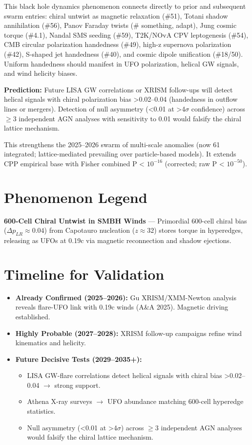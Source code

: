 \documentclass[11pt]{article}
\begin{document}
This black hole dynamics phenomenon connects directly to prior and subsequent swarm entries: chiral untwist as magnetic relaxation (\#51), Totani shadow annihilation (\#56), Panov Faraday twists (\# something, adapt), Jung cosmic torque (\#4.1), Nandal SMS seeding (\#59), T2K/NOvA CPV leptogenesis (\#54), CMB circular polarization handedness (\#49), high-z supernova polarization (\#42), S-shaped jet handedness (\#40), and cosmic dipole unification (\#18/50). Uniform handedness should manifest in UFO polarization, helical GW signals, and wind helicity biases.

\textbf{Prediction:} Future LISA GW correlations or XRISM follow-ups will detect helical signals with chiral polarization bias >0.02--0.04 (handedness in outflow lines or mergers). Detection of null asymmetry (<0.01 at >4$\sigma$ confidence) across $\geq 3$ independent AGN analyses with sensitivity to 0.01 would falsify the chiral lattice mechanism.

This strengthens the 2025--2026 swarm of multi-scale anomalies (now 61 integrated; lattice-mediated prevailing over particle-based models). It extends CPP empirical base with Fisher combined P < $10^{-16}$ (corrected; raw P < $10^{-50}$).

\section{Phenomenon Legend}
\textbf{600-Cell Chiral Untwist in SMBH Winds} — Primordial 600-cell chiral bias ($\Delta p_{LR} \approx 0.04$) from Capotauro nucleation ($z \approx 32$) stores torque in hyperedges, releasing as UFOs at 0.19c via magnetic reconnection and shadow ejections.

\section{Timeline for Validation}
\begin{itemize}
    \item \textbf{Already Confirmed (2025--2026):} Gu XRISM/XMM-Newton analysis reveals flare-UFO link with 0.19c winds (A\&A 2025). Magnetic driving established.
    \item \textbf{Highly Probable (2027--2028):} XRISM follow-up campaigns refine wind kinematics and helicity.
    \item \textbf{Future Decisive Tests (2029--2035+):}
    \begin{itemize}
        \item LISA GW-flare correlations detect helical signals with chiral bias >0.02--0.04 $\to$ strong support.
        \item Athena X-ray surveys $\to$ UFO abundance matching 600-cell hyperedge statistics.
        \item Null asymmetry (<0.01 at >4$\sigma$) across $\geq 3$ independent AGN analyses would falsify the chiral lattice mechanism.
    \end{itemize}
\end{itemize}
\end{document}
